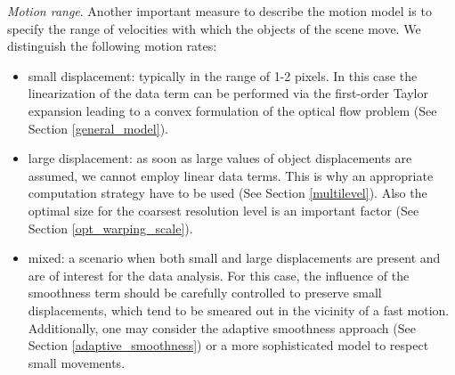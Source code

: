 \noindent \textit{Motion range}. Another important measure to describe the motion model is to specify the range of velocities with which the objects of the scene move. We distinguish the following motion rates:
\begin{itemize}
	\item small displacement: typically in the range of 1-2 pixels. In this case the linearization of the data term can be performed via the first-order Taylor expansion leading to a convex formulation of the optical flow problem (See Section \ref{general_model}). 
	
	\item large displacement: as soon as large values of object displacements are assumed, we cannot employ linear data terms. This is why an appropriate computation strategy have to be used (See Section \ref{multilevel}). Also the optimal size for the coarsest resolution level is an important factor (See Section \ref{opt_warping_scale}).  
	
	\item mixed: a scenario when both small and large displacements are present and are of interest for the data analysis. For this case, the influence of the  smoothness term should be carefully controlled to preserve small displacements, which tend to be smeared out in the vicinity of a fast motion.
	Additionally, one may consider the adaptive smoothness approach (See Section \ref{adaptive_smoothness}) or a more sophisticated model to respect small movements.
\end{itemize}


